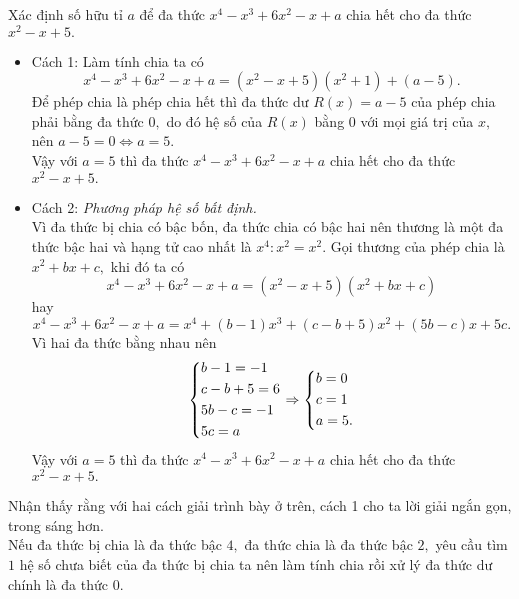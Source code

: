 \begin{vd} %
	Xác định số hữu tỉ $a$ để đa thức $x^4-x^3+6x^2-x+a$ chia hết cho đa thức $x^2-x+5.$
	\loigiai
	{
		\begin{itemize}
			\item Cách 1: Làm tính chia ta có 
			\[x^4-x^3+6x^2-x+a=(x^2-x+5)(x^2+1)+(a-5).\]
			Để phép chia là phép chia hết thì đa thức dư $R(x)=a-5$ của phép chia phải bằng đa thức $0,$ do đó hệ số của $R(x)$ bằng $0$ với mọi giá trị của $x,$ nên $a-5=0\Leftrightarrow a=5.$\\
			Vậy với $a=5$ thì đa thức $x^4-x^3+6x^2-x+a$ chia hết cho đa thức $x^2-x+5.$
			\item  Cách 2: {\it Phương pháp hệ số bất định.} \\
			Vì đa thức bị chia có bậc bốn, đa thức chia có bậc hai nên thương là một đa thức bậc hai và hạng tử cao nhất là $x^4:x^2=x^2.$ Gọi thương của phép chia là $x^2+bx+c,$ khi đó ta có 
			\[x^4-x^3+6x^2-x+a=(x^2-x+5)(x^2+bx+c)\] hay 
			\[x^4-x^3+6x^2-x+a=x^4+(b-1)x^3+(c-b+5)x^2+(5b-c)x+5c.\]
			Vì hai đa thức bằng nhau nên 
			\[\left\{\begin{aligned}&b-1=-1\\&c-b+5=6\\&5b-c=-1\\&5c=a\end{aligned}\right.\Rightarrow\left\{\begin{aligned}&b=0\\&c=1\\&a=5.\end{aligned}\right.\]
			Vậy với $a=5$ thì đa thức $x^4-x^3+6x^2-x+a$ chia hết cho đa thức $x^2-x+5.$
	\end{itemize}}
\begin{note} Nhận thấy rằng với hai cách giải trình bày ở trên, cách 1 cho ta lời giải ngắn gọn, trong sáng hơn.\\
	Nếu đa thức bị chia là đa thức bậc $4,$ đa thức chia là đa thức bậc $2,$ yêu cầu tìm $1$ hệ số chưa biết của đa thức bị chia ta nên làm tính chia rồi xử lý đa thức dư chính là đa thức $0.$
	\end{note}
\end{vd}
